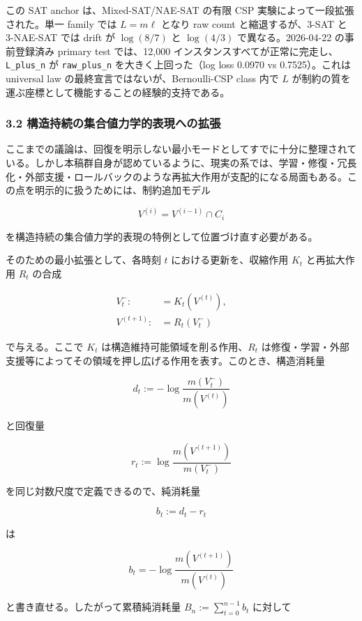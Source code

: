 \documentclass[12pt,a4paper]{article}
\begin{document}
この SAT anchor は、Mixed-SAT/NAE-SAT の有限 CSP 実験によって一段拡張された。単一 family では \(L=m\ell\) となり raw count と縮退するが、3-SAT と 3-NAE-SAT では drift が \(\log(8/7)\) と \(\log(4/3)\) で異なる。2026-04-22 の事前登録済み primary test では、12,000 インスタンスすべてが正常に完走し、\texttt{L\_plus\_n} が \texttt{raw\_plus\_n} を大きく上回った（log loss 0.0970 vs 0.7525）。これは universal law の最終宣言ではないが、Bernoulli-CSP class 内で \(L\) が制約の質を運ぶ座標として機能することの経験的支持である。

\subsubsection{3.2 構造持続の集合値力学的表現への拡張}\label{ux69cbux9020ux6301ux7d9aux306eux96c6ux5408ux5024ux529bux5b66ux7684ux8868ux73feux3078ux306eux62e1ux5f35}

ここまでの議論は、回復を明示しない最小モードとしてすでに十分に整理されている。しかし本稿群自身が認めているように、現実の系では、学習・修復・冗長化・外部支援・ロールバックのような再拡大作用が支配的になる局面もある。この点を明示的に扱うためには、制約追加モデル

\[
V^{(i)} = V^{(i-1)} \cap C_{i}
\]

を構造持続の集合値力学的表現の特例として位置づけ直す必要がある。

そのための最小拡張として、各時刻 \(t\) における更新を、収縮作用 \(K_{t}\) と再拡大作用 \(R_{t}\) の合成

\[
\begin{aligned}
V_{t}^- :&= K_{t}(V^{(t)}), \qquad \\
V^{(t+1)} :&= R_{t}(V_{t}^-)
\end{aligned}
\]

で与える。ここで \(K_{t}\) は構造維持可能領域を削る作用、\(R_{t}\) は修復・学習・外部支援等によってその領域を押し広げる作用を表す。このとき、構造消耗量

\[
d_{t} := - \log \frac{m(V_{t}^-)}{m(V^{(t)})}
\]

と回復量

\[
r_{t} := \log \frac{m(V^{(t+1)})}{m(V_{t}^-)}
\]

を同じ対数尺度で定義できるので、純消耗量

\[
b_{t} := d_{t} - r_{t}
\]

は

\[
b_{t} = - \log \frac{m(V^{(t+1)})}{m(V^{(t)})}
\]

と書き直せる。したがって累積純消耗量 \(B_{n} := \sum_{t=0}^{n-1} b_{t}\) に対して
\end{document}
